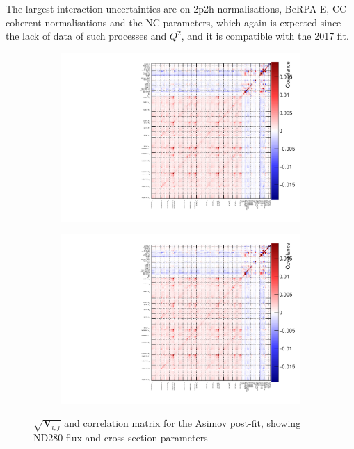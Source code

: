 The largest interaction uncertainties are on 2p2h normalisations, BeRPA E, CC coherent normalisations and the NC parameters, which again is expected since the lack of data of such processes and $Q^2$, and it is compatible with the 2017 fit.
\begin{figure}[h]
	\begin{subfigure}[t]{0.49\textwidth}
		\includegraphics[width=\textwidth, trim={0mm 0mm 0mm 0mm}, clip,page=5]{figures/mach3/2018/asimov/corr/2018a_MultiPi_Binningv6_NewCov_Asimov_merge_drawCorr}
	\end{subfigure}
	\begin{subfigure}[t]{0.49\textwidth}
		\includegraphics[width=\textwidth, trim={0mm 0mm 0mm 0mm}, clip,page=6]{figures/mach3/2018/asimov/corr/2018a_MultiPi_Binningv6_NewCov_Asimov_merge_drawCorr}
	\end{subfigure}
	\caption{$\sqrt{\mathbf{V}_{i,j}}$ and correlation matrix for the Asimov post-fit, showing ND280 flux and cross-section parameters}
	\label{fig:asimov_nd_corr_2018}
\end{figure}

